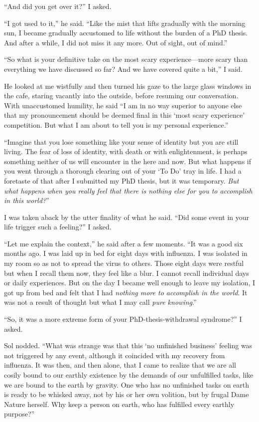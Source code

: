\documentclass[
  a4paper,
]{article}
\begin{document}
``And did you get over it?'' I asked.

``I got used to it,'' he said. ``Like the mist that lifts gradually with
the morning sun, I became gradually accustomed to life without the
burden of a PhD thesis. And after a while, I did not miss it any more.
Out of sight, out of mind.''

``So what is your definitive take on the most scary experience---more
scary than everything we have discussed so far? And we have covered
quite a bit,'' I said.

He looked at me wistfully and then turned his gaze to the large glass
windows in the cafe, staring vacantly into the outside, before resuming
our conversation. With unaccustomed humility, he said ``I am in no way
superior to anyone else that my pronouncement should be deemed final in
this `most scary experience' competition. But what I am about to tell
you is my personal experience.''

``Imagine that you lose something like your sense of identity but you
are still living. The fear of loss of identity, with death or with
enlightenment, is perhaps something neither of us will encounter in the
here and now. But what happens if you went through a thorough clearing
out of your `To Do' tray in life. I had a foretaste of that after I
submitted my PhD thesis, but it was temporary. \emph{But what happens
when you really feel that there is nothing else for you to accomplish in
this world?}''

I was taken aback by the utter finality of what he said. ``Did some
event in your life trigger such a feeling?'' I asked.

``Let me explain the context,'' he said after a few moments. ``It was a
good six months ago. I was laid up in bed for eight days with influenza.
I was isolated in my room so as not to spread the virus to others. Those
eight days were restful but when I recall them now, they feel like a
blur. I cannot recall individual days or daily experiences. But on the
day I became well enough to leave my isolation, I got up from bed and
felt that I had \emph{nothing more to accomplish in the world}. It was
not a result of thought but what I may call \emph{pure knowing}.''

``So, it was a more extreme form of your PhD-thesis-withdrawal
syndrome?'' I asked.

Sol nodded. ``What was strange was that this `no unfinished business'
feeling was not triggered by any event, although it coincided with my
recovery from influenza. It was then, and then alone, that I came to
realize that we are all cosily bound to our earthly existence by the
demands of our unfulfilled tasks, like we are bound to the earth by
gravity. One who has no unfinished tasks on earth is ready to be whisked
away, not by his or her own volition, but by frugal Dame Nature herself.
Why keep a person on earth, who has fulfilled every earthly purpose?''
\end{document}
